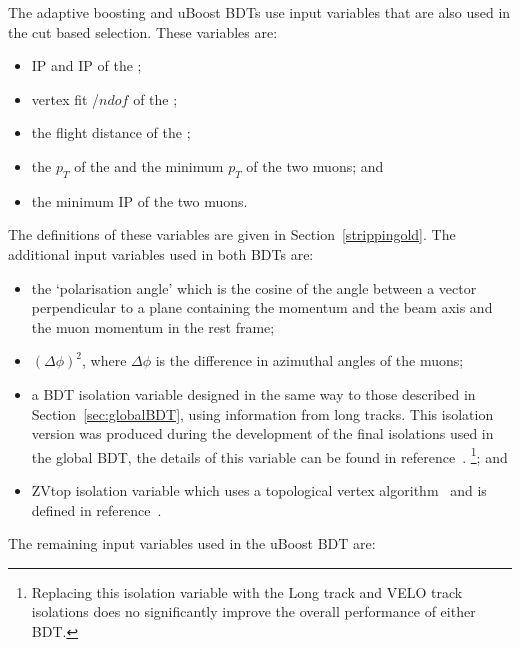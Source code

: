 The adaptive boosting and uBoost BDTs use input variables that are also used in the cut based selection. These variables are:
\begin{itemize}
\item IP and IP \chisqd of the \bs;
\item vertex fit \chisqd/$ndof$ of the \bs; 
\item the flight distance of the \bs;
\item the $p_T$ of the \bs and the minimum $p_T$ of the two muons; and
\item the minimum IP \chisqd of the two muons.
\end{itemize}
The definitions of these variables are given in Section~\ref{strippingold}. The additional input variables used in both BDTs are: %
\begin{itemize}
\item  the `polarisation angle' which is the cosine of the angle between a vector perpendicular to a plane containing the \bs momentum and the beam axis and the muon momentum in the \bs rest frame; 
\item $(\Delta \phi)^{2}$, where $\Delta \phi$ is the difference in azimuthal angles of the muons;
\item a BDT isolation variable designed in the same way to those described in Section~\ref{sec:globalBDT}, using information from long tracks. This isolation version was produced during the development of the final isolations used in the global BDT, the details of this variable can be found in reference~\cite{Archilli:1970886}. \footnote{Replacing this isolation variable with the Long track and VELO track isolations does no significantly improve the overall performance of either BDT.}; and
\item ZVtop isolation variable which uses a topological vertex algorithm~\cite{Jackson:1996sy} and is defined in reference~\cite{Morda:2120795}.
\end{itemize}
The remaining input variables used in the uBoost BDT are:
